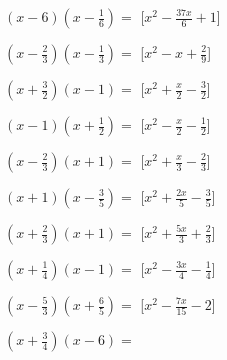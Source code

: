 \begin{esercizio}
\begin{multicols}{2}
\begin{enumeratea}
\item \(\left(x - 6\right)\left(x - \frac{1}{6}\right)=\)
  \hfill [\(x^{2} - \frac{37 x}{6} + 1\)]
\item \(\left(x - \frac{2}{3}\right)\left(x - \frac{1}{3}\right)=\)
  \hfill [\(x^{2} - x + \frac{2}{9}\)]
\item \(\left(x + \frac{3}{2}\right)\left(x - 1\right)=\)
  \hfill [\(x^{2} + \frac{x}{2} - \frac{3}{2}\)]
\item \(\left(x - 1\right)\left(x + \frac{1}{2}\right)=\)
  \hfill [\(x^{2} - \frac{x}{2} - \frac{1}{2}\)]
\item \(\left(x - \frac{2}{3}\right)\left(x + 1\right)=\)
  \hfill [\(x^{2} + \frac{x}{3} - \frac{2}{3}\)]
\item \(\left(x + 1\right)\left(x - \frac{3}{5}\right)=\)
  \hfill [\(x^{2} + \frac{2 x}{5} - \frac{3}{5}\)]
\item \(\left(x + \frac{2}{3}\right)\left(x + 1\right)=\)
  \hfill [\(x^{2} + \frac{5 x}{3} + \frac{2}{3}\)]
\item \(\left(x + \frac{1}{4}\right)\left(x - 1\right)=\)
  \hfill [\(x^{2} - \frac{3 x}{4} - \frac{1}{4}\)]
\item \(\left(x - \frac{5}{3}\right)\left(x + \frac{6}{5}\right)=\)
  \hfill [\(x^{2} - \frac{7 x}{15} - 2\)]
\item \(\left(x + \frac{3}{4}\right)\left(x - 6\right)=\)

\end{enumeratea}
\end{multicols}
\end{esercizio}
